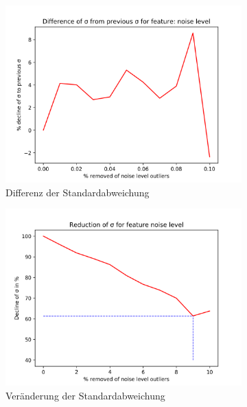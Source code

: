 \begin{figure}[h]
\begin{subfigure}{.5\textwidth}
  \includegraphics[width=\linewidth]{images/anhang/outlier_detection/noise_level_diff_of_std.png}
  \caption{Differenz der Standardabweichung}
\end{subfigure}
\begin{subfigure}{.5\textwidth}
  \centering
  \includegraphics[width=\linewidth]{images/anhang/outlier_detection/noise_level_std.png}
  \caption{Veränderung der Standardabweichung} 
\end{subfigure}
\begin{subfigure}{.5\textwidth}
  \centering

\end{subfigure}
\end{figure}
